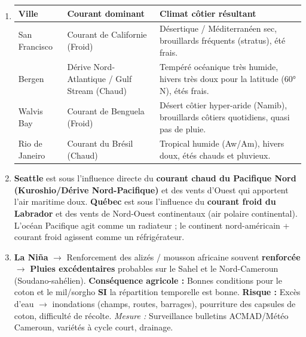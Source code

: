 \documentclass[11pt]{article}
\begin{document}
\begin{corrige}
\begin{enumerate}
    \item
    \begin{center}
    \begin{tabularx}{\linewidth}{|l|X|X|}\hline
    \rowcolor{popblueL} \textbf{Ville} & \textbf{Courant dominant} & \textbf{Climat côtier résultant} \\ \hline
    San Francisco & Courant de Californie (Froid) & Désertique / Méditerranéen sec, brouillards fréquents (stratus), été frais. \\ \hline
    Bergen & Dérive Nord-Atlantique / Gulf Stream (Chaud) & Tempéré océanique très humide, hivers très doux pour la latitude (60° N), étés frais. \\ \hline
    Walvis Bay & Courant de Benguela (Froid) & Désert côtier hyper-aride (Namib), brouillards côtiers quotidiens, quasi pas de pluie. \\ \hline
    Rio de Janeiro & Courant du Brésil (Chaud) & Tropical humide (Aw/Am), hivers doux, étés chauds et pluvieux. \\ \hline
    \end{tabularx}
    \end{center}
    \item \textbf{Seattle} est sous l'influence directe du \textbf{courant chaud du Pacifique Nord (Kuroshio/Dérive Nord-Pacifique)} et des vents d'Ouest qui apportent l'air maritime doux. \textbf{Québec} est sous l'influence du \textbf{courant froid du Labrador} et des vents de Nord-Ouest continentaux (air polaire continental). L'océan Pacifique agit comme un radiateur ; le continent nord-américain + courant froid agissent comme un réfrigérateur.
    \item \textbf{La Niña} $\rightarrow$ Renforcement des alizés / mousson africaine souvent \textbf{renforcée} $\rightarrow$ \textbf{Pluies excédentaires} probables sur le Sahel et le Nord-Cameroun (Soudano-sahélien). \textbf{Conséquence agricole :} Bonnes conditions pour le coton et le mil/sorgho \textbf{SI} la répartition temporelle est bonne. \textbf{Risque :} Excès d'eau $\rightarrow$ inondations (champs, routes, barrages), pourriture des capsules de coton, difficulté de récolte. \textit{Mesure :} Surveillance bulletins ACMAD/Météo Cameroun, variétés à cycle court, drainage.
\end{enumerate}
\end{corrige}
\end{document}
